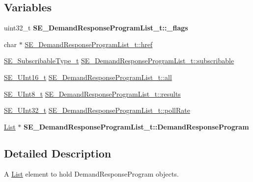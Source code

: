 \subsection*{Variables}
\begin{DoxyCompactItemize}
\item 
\mbox{\label{group__DemandResponseProgramList_gaa0806a18b74d75beca845f074186f80e}} 
uint32\+\_\+t {\bfseries S\+E\+\_\+\+Demand\+Response\+Program\+List\+\_\+t\+::\+\_\+flags}
\item 
char $\ast$ \hyperlink{group__DemandResponseProgramList_ga5073e9c90f4f74248ce8bf5570136c3e}{S\+E\+\_\+\+Demand\+Response\+Program\+List\+\_\+t\+::href}
\item 
\hyperlink{group__SubscribableType_ga5c41f553d369710ed34619266bf2551e}{S\+E\+\_\+\+Subscribable\+Type\+\_\+t} \hyperlink{group__DemandResponseProgramList_ga8ae2eb55ac9951bd8d8e11644ff223f9}{S\+E\+\_\+\+Demand\+Response\+Program\+List\+\_\+t\+::subscribable}
\item 
\hyperlink{group__UInt16_gac68d541f189538bfd30cfaa712d20d29}{S\+E\+\_\+\+U\+Int16\+\_\+t} \hyperlink{group__DemandResponseProgramList_gac5e6faff00dcbcb67882031e92792075}{S\+E\+\_\+\+Demand\+Response\+Program\+List\+\_\+t\+::all}
\item 
\hyperlink{group__UInt8_gaf7c365a1acfe204e3a67c16ed44572f5}{S\+E\+\_\+\+U\+Int8\+\_\+t} \hyperlink{group__DemandResponseProgramList_ga34ad081aa336bdce426fe32f9f22d573}{S\+E\+\_\+\+Demand\+Response\+Program\+List\+\_\+t\+::results}
\item 
\hyperlink{group__UInt32_ga70bd4ecda3c0c85d20779d685a270cdb}{S\+E\+\_\+\+U\+Int32\+\_\+t} \hyperlink{group__DemandResponseProgramList_ga87aca3a2601d33694d6bcc8d0ec3bdc6}{S\+E\+\_\+\+Demand\+Response\+Program\+List\+\_\+t\+::poll\+Rate}
\item 
\mbox{\label{group__DemandResponseProgramList_ga0cc351d9fb686ad098d3036519e06778}} 
\hyperlink{structList}{List} $\ast$ {\bfseries S\+E\+\_\+\+Demand\+Response\+Program\+List\+\_\+t\+::\+Demand\+Response\+Program}
\end{DoxyCompactItemize}


\subsection{Detailed Description}
A \hyperlink{structList}{List} element to hold Demand\+Response\+Program objects. 

